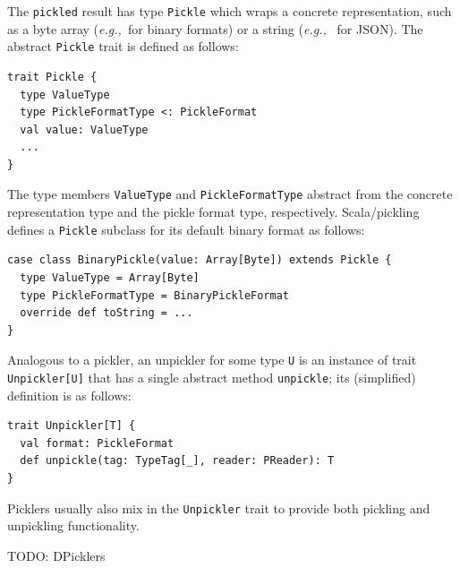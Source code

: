 \documentclass[preprint,10pt]{sigplanconf}
\theoremstyle{definition}
\theoremstyle{definition}
\newcommand{\eg}{{\em e.g.,~}}
\newcommand{\term}[1]{\mbox{\texttt{#1}}}
\begin{document}
The \verb|pickled| result has type \verb|Pickle| which wraps a concrete
representation, such as a byte array (\eg for binary formats) or a string (\eg
for JSON). The abstract \verb|Pickle| trait is defined as follows:

\begin{lstlisting}
trait Pickle {
  type ValueType
  type PickleFormatType <: PickleFormat
  val value: ValueType
  ...
}
\end{lstlisting}
\noindent
The type members \verb|ValueType| and \verb|PickleFormatType| abstract from
the concrete representation type and the pickle format type, respectively.
Scala/pickling defines a \verb|Pickle| subclass for its default binary format
as follows:

\begin{lstlisting}
case class BinaryPickle(value: Array[Byte]) extends Pickle {
  type ValueType = Array[Byte]
  type PickleFormatType = BinaryPickleFormat
  override def toString = ...
}
\end{lstlisting}
\noindent

Analogous to a pickler, an unpickler for some type \verb|U| is an instance of
trait \verb|Unpickler[U]| that has a single abstract method \verb|unpickle|;
its (simplified) definition is as follows:

\begin{lstlisting}
trait Unpickler[T] {
  val format: PickleFormat
  def unpickle(tag: TypeTag[_], reader: PReader): T
}
\end{lstlisting}
\noindent

Picklers usually also mix in the \verb|Unpickler| trait to provide both
pickling and unpickling functionality.

TODO: DPicklers






\end{document}
